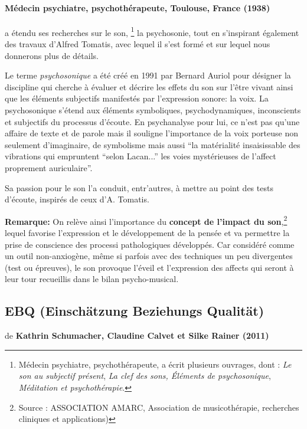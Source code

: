 \paragraph{Médecin psychiatre,
   psychothérapeute, Toulouse, France (1938)}
a étendu ses recherches sur le son, \footnote{Médecin psychiatre, psychothérapeute,  a écrit plusieurs ouvrages, dont : \textsl{Le son au subjectif présent}, \textsl{La clef des sons, Éléments de psychosonique}, \textsl{Méditation et
  psychothérapie}.} la psychosonie, 
tout en s'inspirant également des
travaux d'Alfred Tomatis, avec lequel il s'est formé et sur lequel
nous donnerons plus de détails.

Le terme \emph{psychosonique} a été créé en 1991 par Bernard Auriol pour
désigner la discipline qui cherche à évaluer et décrire les effets du
son sur l'être vivant ainsi que les éléments
subjectifs manifestés par l'expression sonore:  la
voix. La psychosonique s'étend aux éléments
symboliques, psychodynamiques, inconscients et subjectifs du processus
d'écoute. En psychanalyse pour lui, ce n'est pas qu'une affaire de
texte et de parole mais il souligne l'importance de la voix porteuse non seulement
d'imaginaire, de symbolisme mais aussi ``la matérialité insaisissable
des vibrations qui empruntent ``selon Lacan...'' les voies mystérieuses de
l'affect proprement auriculaire''.

\autocite[ch. 13]{auriol:cle}

Sa passion pour le son l'a conduit, entr'autres, à mettre au point des tests
d'écoute, inspirés de ceux d'A. Tomatis.




\textbf{Remarque: } 
On relève ainsi l'importance du \textbf{concept de l'impact du son},\footnote{Source : ASSOCIATION AMARC,
  Association de musicothérapie, recherches cliniques et
  applications) } 
lequel favorise l'expression et le développement de la pensée et va
permettre la prise de conscience des processi pathologiques
développés. Car considéré comme un outil non-anxiogène, même si parfois avec des
techniques un peu divergentes (test ou épreuves), le son provoque l'éveil et l'expression
des affects qui seront à leur tour recueillis dans le bilan psycho-musical.



\subsection{EBQ (Einschätzung Beziehungs Qualität)}
de \textbf{Kathrin Schumacher, Claudine Calvet et Silke Rainer (2011)}


